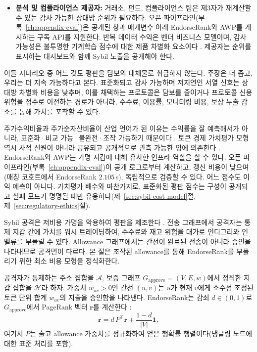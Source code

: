 \begin{itemize}
\item \textbf{분석 및 컴플라이언스 제공자:} 거래소, 펀드, 컴플라이언스 팀은 제3자가 재계산할 수 있는 감사 가능한 상대방 순위가 필요하다. 오픈 파이프라인(부록~\ref{ch:appendix-eval})은 공개된 창과 매개변수 아래 EndorseRank와 AWP를 게시하는 구독 API를 지원한다. 반복 데이터 수익은 벤더 비즈니스 모델이며, 감사 가능성은 불투명한 기계학습 점수에 대한 제품 차별화 요소이다 . 제공자는 순위를 표시하는 대시보드와 함께 Sybil 노출을 공개해야 한다.
\end{itemize}

이들 시나리오 중 어느 것도 평판을 담보의 대체물로 취급하지 않는다. 주장은 더 좁고, 우리는 더 지속 가능하다고 본다. 표준화되고 감사 가능하며 저지연인 서열 신호는 상대방 차별화 비용을 낮추며, 이를 채택하는 프로토콜은 담보를 줄이거나 프로토콜 신용 위험을 점수로 이전하는 경로가 아니라, 수수료, 이용률, 모니터링 비용, 보상 누출 감소를 통해 가치를 포착할 수 있다.


주가수익비율과 주가순자산비율이 산업 언어가 된 이유는 수익률을 잘 예측해서가 아니라, 표준화·비교 가능·불완전·조작 가능하기 때문이다 . 토큰 경제 가치평가 모형 역시 사적 신원이 아니라 공유되고 공개적으로 관측 가능한 양에 의존한다 . EndorseRank와 AWP는 가명 지갑에 대해 유사한 인프라 역할을 할 수 있다. 오픈 파이프라인(부록~\ref{ch:appendix-eval})이 공개 로그로부터 계산하고, 갱신 비용이 낮으며(매칭 코호트에서 EndorseRank $2.105$\,s), 독립적으로 검증할 수 있다. 어느 점수도 이익 예측이 아니다. 가치평가 배수와 마찬가지로, 표준화된 평판 점수는 구성이 공개되고 실패 모드가 명명될 때만 유용하다(제~\ref{sec:sybil-cost-model}절, 제~\ref{sec:regulatory-ethics}절).


Sybil 공격은 저비용 가명을 악용하여 평판을 제조한다 . 전송 그래프에서 공격자는 통제 지갑 간에 가치를 워시 트레이딩하여, 수수료와 재고 위험을 대가로 인디그리와 인밸류를 부풀릴 수 있다. Allowance 그래프에서는 간선이 완료된 전송이 아니라 승인을 나타내므로 공격면이 다르다. 본 절은 조작된 allowance를 통해 EndorseRank를 부풀리기 위한 최소 비용 모형을 정식화한다.


공격자가 통제하는 주소 집합을 $\mathcal{A}$, 보증 그래프 $G_{\text{approve}}=(V,E,w)$에서 정직한 지갑 집합을 $\mathcal{H}$라 하자. 가중치 $w_{uv}>0$인 간선 $(u,v)$는 $u$가 현재 $v$에게 소수점 조정된 토큰 단위 합계 $w_{uv}$의 지출을 승인함을 나타낸다. EndorseRank는 감쇠 $d\in(0,1)$로 $G_{\text{approve}}$에서 PageRank 벡터 $\mathbf{r}$를 계산한다 :
\begin{equation}
\label{eq:pagerank-sybil}
\mathbf{r} = d\, P^{\top} \mathbf{r} + \frac{1-d}{|V|}\mathbf{1},
\end{equation}
여기서 $P$는 출고 allowance 가중치를 정규화하여 얻은 행확률 행렬이다(댕글링 노드에 대한 표준 처리를 포함).

